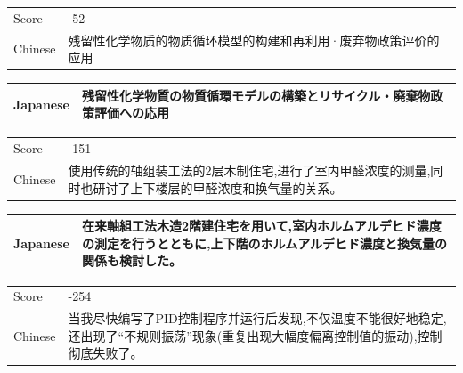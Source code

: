 \vspace{0.3cm}
\begin{table}[h]
    \centering
    \begin{CJK}{UTF8}{gbsn}
        \begin{tabularx}{\textwidth}{lb}\toprule
            Score & -52 \\
            {Chinese } & 残留性化学物质的物质循环模型的构建和再利用·废弃物政策评价的应用 \\
        \end{tabularx}
    \end{CJK}
    \begin{CJK}{UTF8}{long}
        \begin{tabularx}{\textwidth}{lb}
            Japanese & 残留性化学物質の物質循環モデルの構築とリサイクル・廃棄物政策評価への応用 \\
            \midrule
        \end{tabularx}
    \end{CJK}
    \begin{CJK}{UTF8}{gbsn}
        \begin{tabularx}{\textwidth}{lb}
            Score & -151 \\
            {Chinese } & 使用传统的轴组装工法的2层木制住宅,进行了室内甲醛浓度的测量,同时也研讨了上下楼层的甲醛浓度和换气量的关系。 \\
        \end{tabularx}
    \end{CJK}
    \begin{CJK}{UTF8}{long}
        \begin{tabularx}{\textwidth}{lb}
            Japanese & 在来軸組工法木造2階建住宅を用いて,室内ホルムアルデヒド濃度の測定を行うとともに,上下階のホルムアルデヒド濃度と換気量の関係も検討した。 \\
            \midrule
        \end{tabularx}
    \end{CJK}
    \begin{CJK}{UTF8}{gbsn}
        \begin{tabularx}{\textwidth}{lb}
            Score & -254 \\
            {Chinese } & 当我尽快编写了PID控制程序并运行后发现,不仅温度不能很好地稳定,还出现了“不规则振荡”现象(重复出现大幅度偏离控制值的振动),控制彻底失败了。 \\
        \end{tabularx}
    \end{CJK}
    \begin{CJK}{UTF8}{long}

\end{CJK}
\end{table}

